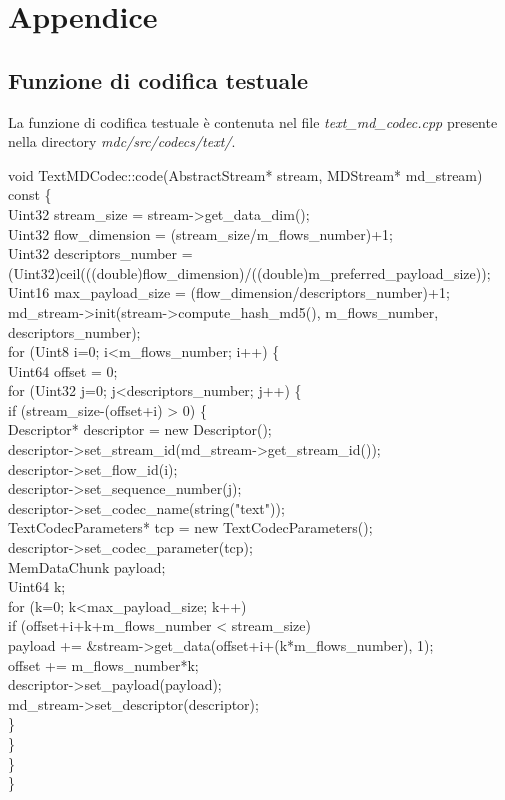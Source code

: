 \chapter{Appendice}
\section{Funzione di codifica testuale}

La funzione di codifica testuale \`e contenuta nel file \textit{text\_md\_codec.cpp} presente nella directory \textit{mdc/src/codecs/text/}.

\begin{code}
void TextMDCodec::code(AbstractStream* stream, MDStream* md\_stream) const \{\\
	Uint32 stream\_size = stream->get\_data\_dim();\\
	Uint32 flow\_dimension = (stream\_size/m\_flows\_number)+1;\\
	Uint32 descriptors\_number = \\(Uint32)ceil(((double)flow\_dimension)/((double)m\_preferred\_payload\_size));\\
	Uint16 max\_payload\_size = (flow\_dimension/descriptors\_number)+1;\\
	md\_stream->init(stream->compute\_hash\_md5(), m\_flows\_number, descriptors\_number);\\
	for (Uint8 i=0; i<m\_flows\_number; i++) \{\\
		Uint64 offset = 0;\\
		for (Uint32 j=0; j<descriptors\_number; j++) \{\\
			if (stream\_size-(offset+i) > 0) \{\\
				Descriptor* descriptor = new Descriptor();\\
				descriptor->set\_stream\_id(md\_stream->get\_stream\_id());\\
				descriptor->set\_flow\_id(i);\\
				descriptor->set\_sequence\_number(j);\\
				descriptor->set\_codec\_name(string("text"));\\
				TextCodecParameters* tcp = new TextCodecParameters();\\
				descriptor->set\_codec\_parameter(tcp);\\
				MemDataChunk payload;\\
				Uint64 k;\\
				for (k=0; k<max\_payload\_size; k++)\\
					if (offset+i+k+m\_flows\_number < stream\_size)\\
						payload += \&stream->get\_data(offset+i+(k*m\_flows\_number), 1);\\
				offset += m\_flows\_number*k;\\
				descriptor->set\_payload(payload);\\
				md\_stream->set\_descriptor(descriptor);\\
			\}\\
		\}\\
	\}\\
\}\\
\end{code}

